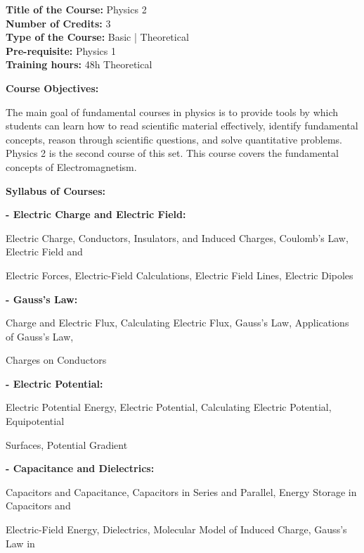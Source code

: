 \documentclass[12pt,a4paper]{article}
\begin{document}
\newpage
\textbf{Title of the Course:} Physics 2\\
\textbf{Number of Credits:} 3\\
\textbf{Type of the Course:} Basic | Theoretical\\
\textbf{Pre-requisite:} Physics 1\\
\textbf{Training hours:} 48h Theoretical\par\vspace{4pt}
\textbf{Course Objectives:}\par\vspace{2pt}
The main goal of fundamental courses in physics is to provide tools by which students can learn
how to read scientific material effectively, identify fundamental concepts, reason through scientific
questions, and solve quantitative problems. Physics 2 is the second course of this set. This course
covers the fundamental concepts of Electromagnetism.\par\vspace{4pt}
\textbf{Syllabus of Courses:}\par\vspace{2pt}
\vspace{2pt}\textbf{- Electric Charge and Electric Field:}\par
Electric Charge, Conductors, Insulators, and Induced Charges, Coulomb’s Law, Electric Field and\par
Electric Forces, Electric-Field Calculations, Electric Field Lines, Electric Dipoles\par
\vspace{2pt}\textbf{- Gauss’s Law:}\par
Charge and Electric Flux, Calculating Electric Flux, Gauss’s Law, Applications of Gauss’s Law,\par
Charges on Conductors\par
\vspace{2pt}\textbf{- Electric Potential:}\par
Electric Potential Energy, Electric Potential, Calculating Electric Potential, Equipotential\par
Surfaces, Potential Gradient\par
\vspace{2pt}\textbf{- Capacitance and Dielectrics:}\par
Capacitors and Capacitance, Capacitors in Series and Parallel, Energy Storage in Capacitors and\par
Electric-Field Energy, Dielectrics, Molecular Model of Induced Charge, Gauss’s Law in\par
\end{document}

